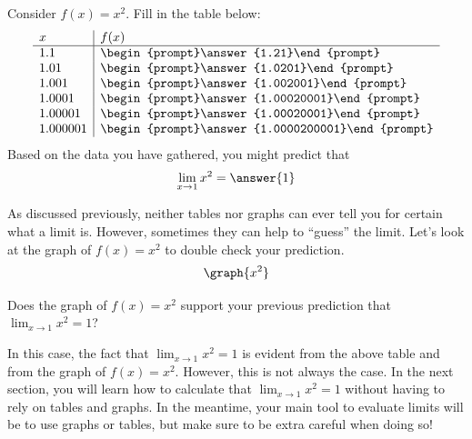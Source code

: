 \documentclass[handout]{ximera}
\begin{document}
\begin{exercise}
Consider $f(x) = x^2$. Fill in the 
  table below:
  \[
  \begin{array}{l|l}
    x      & f(x)      \\ \hline
    1.1    & \begin{prompt}\answer{1.21}\end{prompt}\\
    1.01   & \begin{prompt}\answer{1.0201}\end{prompt}\\
    1.001  & \begin{prompt}\answer{1.002001}\end{prompt}\\
    1.0001 & \begin{prompt}\answer{1.00020001}\end{prompt}\\
    1.00001 & \begin{prompt}\answer{1.00020001}\end{prompt}\\
    1.000001 & \begin{prompt}\answer{1.0000200001}\end{prompt}
  \end{array}
  \]
  Based on the data you have gathered, you might predict that 
  \[
  \lim_{x\to 1} x^2 = \answer{1}
  \]
  
    \begin{exercise}
    As discussed previously, neither tables nor graphs can ever tell you for certain what a limit is. However, sometimes they can help to ``guess'' the limit. Let's look at the graph of $f(x) = x^2$ to double check your prediction. 
\[
\graph{x^2}
\]

Does the graph of $f(x) = x^2$ support your previous prediction that $\lim_{x\to 1} x^2 = 1$? 

\begin{multipleChoice}
    
\begin{feedback}[correct]

In this case, the fact that $\lim_{x\to 1} x^2 = 1$ is evident from the above table and from the graph of $f(x) = x^2$.  However, this is not always the case.  In the next section, you will learn how to calculate that $\lim_{x\to 1} x^2 = 1$ without having to rely on tables and graphs.  In the meantime, your main tool to evaluate limits will be to use graphs or tables, but make sure to be extra careful when doing so! 

\end{feedback}
\end{multipleChoice}
    \end{exercise}

\end{exercise}
\end{document}
